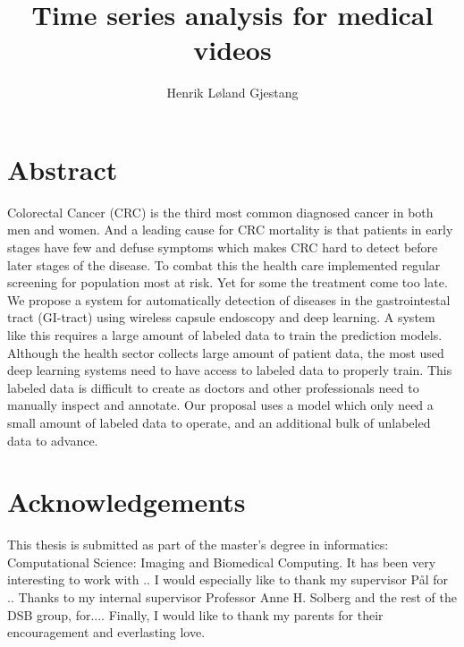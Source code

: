 \documentclass[a4paper,english,11pt,twoside,openright]{report}
\title{Time series analysis for medical videos}
\author{Henrik Løland Gjestang}
\begin{document}

\duoforside[program={Computational Science},
  			dept={Department of Informatics},
  			option={Imaging and Biomedical Computing},
  			long]







\cleardoublepage {}
\section*{Abstract}
Colorectal Cancer (CRC) is the third most common diagnosed cancer in both men and women. And a leading cause for CRC mortality is that patients in early stages have few and defuse symptoms which makes CRC hard to detect before later stages of the disease. To combat this the health care implemented regular screening for population most at risk. Yet for some the treatment come too late. 
We propose a system for automatically detection of diseases in the gastrointestal tract (GI-tract) using wireless capsule endoscopy and deep learning. A system like this requires a large amount of labeled data to train the prediction models. Although the health sector collects large amount of patient data, the most used deep learning systems need to have access to labeled data to properly train. This labeled data is difficult to create as doctors and other professionals need to manually inspect and annotate. Our proposal uses a model which only need a small amount of labeled data to operate, and an additional bulk of unlabeled data to advance. 


\tableofcontents
\listoffigures
{}
\listoftables
{}

\cleardoublepage
\section*{Acknowledgements}
This thesis is submitted as part of the master's degree in informatics: Computational Science: Imaging and Biomedical Computing. It has been very interesting to work with ..
\medbreak \noindent
I would especially like to thank my supervisor Pål for ..
\medbreak \noindent
Thanks to my internal supervisor Professor Anne H. Solberg and the rest of the DSB group, for....
\medbreak \noindent
Finally, I would like to thank my parents for their encouragement and everlasting love.
\end{document}
